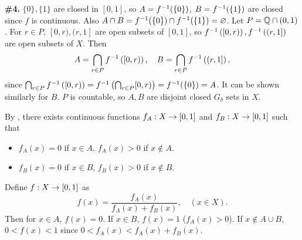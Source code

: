 \documentclass[a4paper,11pt]{article}
\begin{document}
\begin{minipage}[t][270mm]{90mm}
    {\bfseries \large \#4.} \note{\mimp} \(\{0\}, \{1\}\) are closed in \([0, 1]\), so \(A = f^{-1}(\{0\})\), \(B = f^{-1}(\{1\})\) are closed since \(f\) is continuous. Also \(A \cap B = f^{-1}(\{0\}) \cap f^{-1}(\{1\}) = \varnothing\). Let \(P = \mathbb{Q} \cap (0, 1)\). For \(r \in P\), \([0, r), (r, 1]\) are open subsets of \([0, 1]\), so \(f^{-1}\left( [0, r) \right), f^{-1}\left( (r, 1] \right)\) are open subsets of \(X\). Then
    \[
        A = \bigcap_{r \in P} f^{-1}\left( [0, r) \right), \quad B = \bigcap_{r\in P} f^{-1}\left( (r, 1] \right),
    \]
    since \(\bigcap_{r\in P} f^{-1}\left( [0, r) \right) = f^{-1}\left( \bigcap_{r \in P} [0, r) \right) = f^{-1}(\{0\}) = A\). It can be shown similarly for \(B\). \(P\) is countable, so \(A, B\) are disjoint closed \(G_\delta\) sets in \(X\).

    \note{\mimpd} By , there exists continuous functions \(f_A : X \rightarrow [0, 1]\) and \(f_B : X \rightarrow [0, 1]\) such that
    \begin{itemize}
        \item \(f_A(x) = 0\) if \(x \in A\), \(f_A(x) > 0\) if \(x \notin A\).
        \item \(f_B(x) = 0\) if \(x \in B\), \(f_B(x) > 0\) if \(x \notin B\).
    \end{itemize}
    Define \(f : X \rightarrow [0, 1]\) as
    \[
        f(x) = \frac{f_A(x)}{f_A(x) + f_B(x)}, \quad (x \in X).
    \]
    Then for \(x \in A\), \(f(x) = 0\). If \(x \in B\), \(f(x) = 1\) (\(f_A(x) > 0\)). If \(x \notin A\cup B\), \(0 < f(x) < 1\) since \(0 < f_A(x) < f_A(x) + f_B(x)\).

\end{minipage}
{\color{gray}\vline}
\begin{minipage}[t][270mm]{90mm}
    \phantom{?}
\end{minipage}

\newpage

\phantom{?}
\vspace{5mm}
\end{document}
